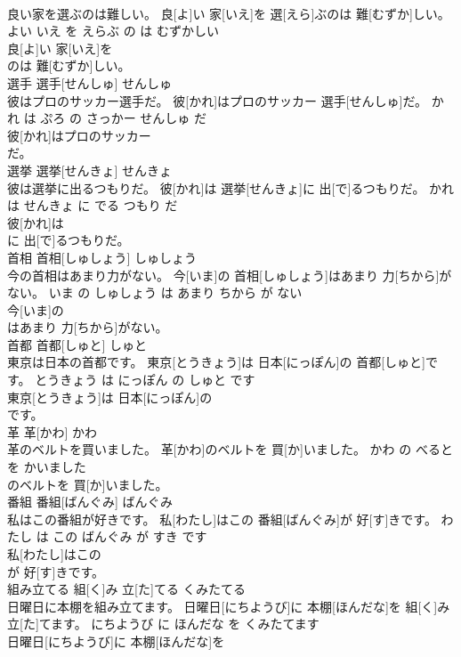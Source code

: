\documentclass[8pt]{extreport}
\begin{document}
\begin{CJK}{UTF8}{min}
\\	良い家を選ぶのは難しい。	良[よ]い 家[いえ]を 選[えら]ぶのは 難[むずか]しい。	よい いえ を えらぶ の は むずかしい	
\\	良[よ]い 家[いえ]を
\\	のは 難[むずか]しい。			
\\	選手	選手[せんしゅ]	せんしゅ	
\\	彼はプロのサッカー選手だ。	彼[かれ]はプロのサッカー 選手[せんしゅ]だ。	かれ は ぷろ の さっかー せんしゅ だ	
\\	彼[かれ]はプロのサッカー
\\	だ。			
\\	選挙	選挙[せんきょ]	せんきょ	
\\	彼は選挙に出るつもりだ。	彼[かれ]は 選挙[せんきょ]に 出[で]るつもりだ。	かれ は せんきょ に でる つもり だ	
\\	彼[かれ]は
\\	に 出[で]るつもりだ。			
\\	首相	首相[しゅしょう]	しゅしょう	
\\	今の首相はあまり力がない。	今[いま]の 首相[しゅしょう]はあまり 力[ちから]がない。	いま の しゅしょう は あまり ちから が ない	
\\	今[いま]の
\\	はあまり 力[ちから]がない。			
\\	首都	首都[しゅと]	しゅと	
\\	東京は日本の首都です。	東京[とうきょう]は 日本[にっぽん]の 首都[しゅと]です。	とうきょう は にっぽん の しゅと です	
\\	東京[とうきょう]は 日本[にっぽん]の
\\	です。			
\\	革	革[かわ]	かわ	
\\	革のベルトを買いました。	革[かわ]のベルトを 買[か]いました。	かわ の べると を かいました	
\\	のベルトを 買[か]いました。			
\\	番組	番組[ばんぐみ]	ばんぐみ	
\\	私はこの番組が好きです。	私[わたし]はこの 番組[ばんぐみ]が 好[す]きです。	わたし は この ばんぐみ が すき です	
\\	私[わたし]はこの
\\	が 好[す]きです。			
\\	組み立てる	組[く]み 立[た]てる	くみたてる	
\\	日曜日に本棚を組み立てます。	日曜日[にちようび]に 本棚[ほんだな]を 組[く]み 立[た]てます。	にちようび に ほんだな を くみたてます	
\\	日曜日[にちようび]に 本棚[ほんだな]を

\end{CJK}
\end{document}
